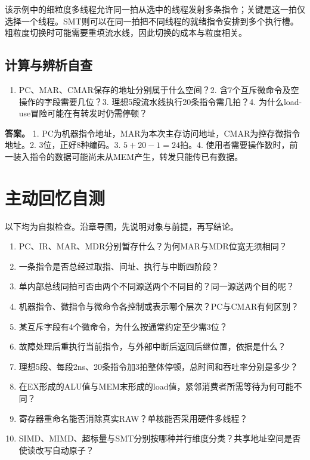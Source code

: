 该示例中的细粒度多线程允许同一拍从选中的线程发射多条指令；关键是这一拍仅选择一个线程。SMT则可以在同一拍把不同线程的就绪指令安排到多个执行槽。粗粒度切换时可能需要重填流水线，因此切换的成本与粒度相关。

\subsection{计算与辨析自查}\label{CO05-extra-check}

\begin{enumerate}
\def\labelenumi{\arabic{enumi}.}
\tightlist
\item
  PC、MAR、CMAR保存的地址分别属于什么空间？2. 含7个互斥微命令及空操作的字段需要几位？3. 理想5段流水线执行20条指令需几拍？4. 为什么load-use冒险可能在有转发时仍需停顿？
\end{enumerate}

\textbf{答案。} 1. PC为机器指令地址，MAR为本次主存访问地址，CMAR为控存微指令地址。2. 3位，正好8种编码。3. \(5+20-1=24\)拍。4. 使用者需要操作数时，前一装入指令的数据可能尚未从MEM产生，转发只能传已有数据。

\section{主动回忆自测}\label{CO05-recall}

以下均为自拟检查。沿章导图，先说明对象与前提，再写结论。

\begin{enumerate}
\def\labelenumi{\arabic{enumi}.}
\tightlist
\item
  PC、IR、MAR、MDR分别暂存什么？为何MAR与MDR位宽无须相同？
\item
  一条指令是否总经过取指、间址、执行与中断四阶段？
\item
  单内部总线同拍可否由两个不同源送两个不同目的？同一源送两个目的呢？
\item
  机器指令、微指令与微命令各控制或表示哪个层次？PC与CMAR有何区别？
\item
  某互斥字段有4个微命令，为什么按通常约定至少需3位？
\item
  故障处理后重执行当前指令，与外部中断后返回后继位置，依据是什么？
\item
  理想5段、每段2ns、20条指令加3拍整体停顿，总时间和吞吐率分别是多少？
\item
  在EX形成的ALU值与MEM末形成的load值，紧邻消费者所需等待为何可能不同？
\item
  寄存器重命名能否消除真实RAW？单核能否采用硬件多线程？
\item
  SIMD、MIMD、超标量与SMT分别按哪种并行维度分类？共享地址空间是否使读改写自动原子？
\end{enumerate}

